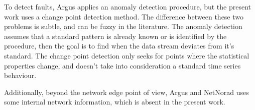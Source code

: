 To detect faults, Argus applies an anomaly detection procedure, but the present
work uses a change point detection method. The difference between
these two problems is subtle, and can be fuzzy in the literature. The
anomaly detection assumes that a standard pattern is already known or
is identified by the procedure, then the goal is to find when the data
stream
deviates from it's standard. The change point detection only seeks for
points where the statistical properties change, and doesn't take into
consideration a standard time series behaviour.

Additionally, beyond the network edge point of view, Argus and NetNorad
uses some internal network information, which is absent in the present work.
